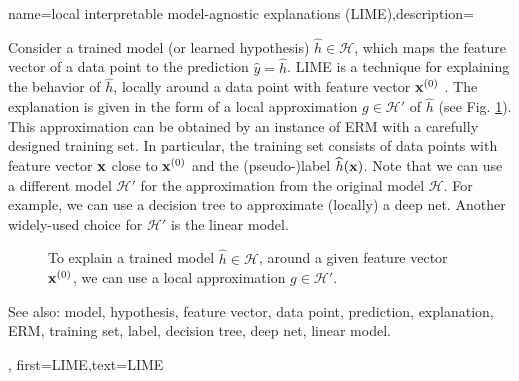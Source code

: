{name={local interpretable model-agnostic explanations (LIME)},description={
		Consider 
		a trained model (or learned hypothesis) $\widehat{h} \in \mathcal{H}$, 
		which maps the feature vector of a data point to the prediction $\widehat{y}= \widehat{h}$. 
		LIME is a technique for explaining 
		the behavior of $\widehat{h}$, locally around a data point with feature vector ${\bf x}^{(0)}$ \cite{Ribeiro2016}. 
		The explanation is given in the form of a local approximation $g \in \mathcal{H}'$ of $\widehat{h}$ (see Fig. \ref{fig_lime}). 
		This approximation can be obtained by an instance of ERM with a carefully designed 
		training set. In particular, the training set consists of data points with 
		feature vector ${\bf x}$ close to ${\bf x}^{(0)}$ and the (pseudo-)label $\widehat{h}({\bf x})$. 
		Note that we can use a different model $\mathcal{H}'$ for the approximation from 
		the original model $\mathcal{H}$. For example, we can use a decision tree 
		to approximate (locally) a deep net. Another widely-used choice for $\mathcal{H}'$ is 
		the linear model. 
		\begin{figure}[H]
		\begin{center}
		\end{center}
		\caption{To explain a trained model $\widehat{h} \in \mathcal{H}$, around a 
		given feature vector ${\bf x}^{(0)}$, we can use a local approximation $g \in \mathcal{H}'$. }
		\label{fig_lime}
		\end{figure}
		See also: model, hypothesis, feature vector, data point, prediction, explanation, ERM, training set, label, decision tree, deep net, linear model.},
	first={LIME},text={LIME}
}



